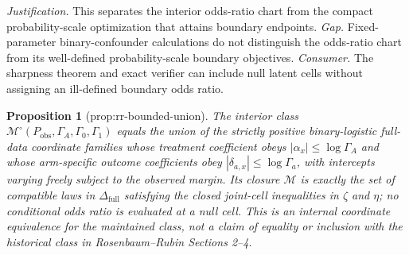 \documentclass{article}
\newtheorem{proposition}{Proposition}
\begin{document}
\par\smallskip\noindent \textit{Justification.} This separates the interior odds-ratio chart from the compact probability-scale optimization that attains boundary endpoints. \textit{Gap.} Fixed-parameter binary-confounder calculations do not distinguish the odds-ratio chart from its well-defined probability-scale boundary objectives. \textit{Consumer.} The sharpness theorem and exact verifier can include null latent cells without assigning an ill-defined boundary odds ratio.

\begin{proposition}[prop:rr-bounded-union]\label{prop:rr-bounded-union}
The interior class \(\mathcal M^{\circ}(P_{\mathrm{obs}},\Gamma_A,\Gamma_0,\Gamma_1)\) equals the union of the strictly positive binary-logistic full-data coordinate families whose treatment coefficient obeys \(|\alpha_x|\leq\log\Gamma_A\) and whose arm-specific outcome coefficients obey \(|\delta_{a,x}|\leq\log\Gamma_a\), with intercepts varying freely subject to the observed margin.  Its closure \(\mathcal M\) is exactly the set of compatible laws in \(\Delta_{\mathrm{full}}\) satisfying the closed joint-cell inequalities in \(\zeta\) and \(\eta\); no conditional odds ratio is evaluated at a null cell.  This is an internal coordinate equivalence for the maintained class, not a claim of equality or inclusion with the historical class in Rosenbaum--Rubin Sections 2--4.
\end{proposition}
\end{document}

